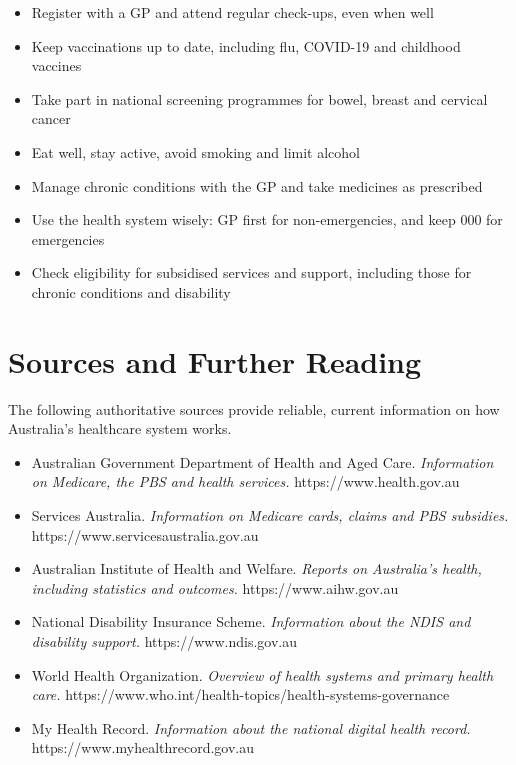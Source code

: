 \begin{itemize}
    \item Register with a GP and attend regular check-ups, even when well
    \item Keep vaccinations up to date, including flu, COVID-19 and childhood vaccines
    \item Take part in national screening programmes for bowel, breast and cervical cancer
    \item Eat well, stay active, avoid smoking and limit alcohol
    \item Manage chronic conditions with the GP and take medicines as prescribed
    \item Use the health system wisely: GP first for non-emergencies, and keep 000 for emergencies
    \item Check eligibility for subsidised services and support, including those for chronic conditions and disability
\end{itemize}

\section*{Sources and Further Reading}
The following authoritative sources provide reliable, current information on how Australia's healthcare system works.

\begin{itemize}
    \item Australian Government Department of Health and Aged Care. \textit{Information on Medicare, the PBS and health services.} https://www.health.gov.au
    \item Services Australia. \textit{Information on Medicare cards, claims and PBS subsidies.} https://www.servicesaustralia.gov.au
    \item Australian Institute of Health and Welfare. \textit{Reports on Australia's health, including statistics and outcomes.} https://www.aihw.gov.au
    \item National Disability Insurance Scheme. \textit{Information about the NDIS and disability support.} https://www.ndis.gov.au
    \item World Health Organization. \textit{Overview of health systems and primary health care.} https://www.who.int/health-topics/health-systems-governance
    \item My Health Record. \textit{Information about the national digital health record.} https://www.myhealthrecord.gov.au
\end{itemize}
